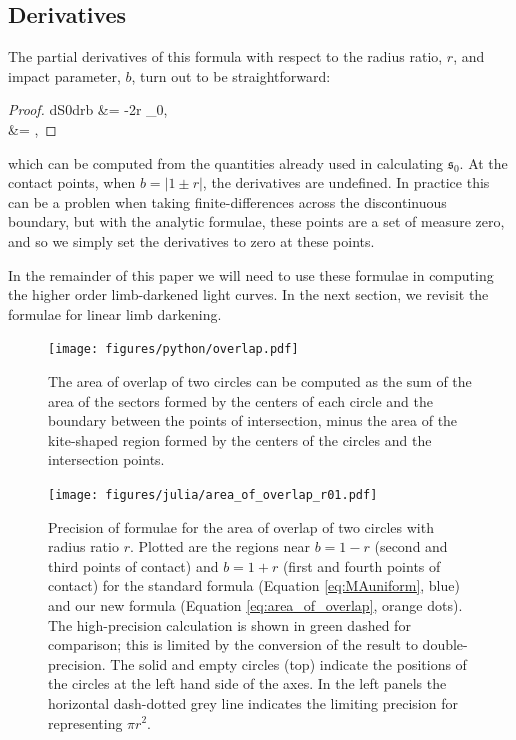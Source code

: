 \documentclass[modern]{aastex61}
\begin{document}
\subsection{Derivatives}

The partial derivatives of this formula with respect to the radius
ratio, $r$, and impact parameter, $b$, turn out to be straightforward:
\begin{proof}{dS0drb}\label{eq:dS0_drb}
 &= -2r \kappa_0,\nonumber\\
 &= ,
\end{proof}
which can be computed from the quantities already used in calculating $\mathfrak{s}_0$.
At the contact points, when $b = \vert 1\pm r\vert$, the derivatives are undefined.
In practice this can be a problen when taking finite-differences across
the discontinuous boundary, but with the analytic formulae, these points
are a set of measure zero, and so we simply set the derivatives to zero
at these points.

In the remainder of this paper we will need to use these formulae in computing
the higher order limb-darkened light curves.  In the next section, we revisit the formulae
for linear limb darkening.

\begin{figure}[p!]
    \begin{centering}
    \texttt{[image: figures/python/overlap.pdf]}
    \caption{The area of overlap of two circles can be computed as the sum of
    the area of the sectors formed by the centers of each circle and the
    boundary between the points of intersection, minus the area of the kite-shaped
    region formed by the centers of the circles and the intersection points.
    \label{fig:circle_overlap}}
    \end{centering}
\end{figure}

\begin{figure}[p!]
    \begin{centering}
    \texttt{[image: figures/julia/area\_of\_overlap\_r01.pdf]}
    \caption{Precision of formulae for the area of overlap of two circles with
    radius ratio $r$.  Plotted are the regions near $b=1-r$ (second and third
    points of contact) and $b=1+r$ (first and fourth points of contact) for
    the standard formula (Equation \ref{eq:MAuniform}, blue) and our new formula
    (Equation \ref{eq:area_of_overlap}, orange dots).
    The high-precision calculation is shown in green dashed for comparison; this
    is limited by the conversion of the result to double-precision. The
    solid and empty circles (top) indicate the positions of the circles at the left
    hand side of the axes.  In the left panels the horizontal dash-dotted grey line 
    indicates the limiting precision for representing $\pi r^2$. \label{fig:overlap_precision}}
    \end{centering}
\end{figure}
\end{document}
